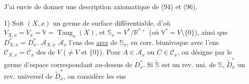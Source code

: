 J'ai envie de donner une description axiomatique de (94) et (96).

1) Soit  $(X,x)$ un germe de surface différentiable, d'où
$V_{X,x}=V_x=\mathbb V=\operatorname{Tang}_x(X)$,
et $\mathbb S_x=V^*/\mathbb R^{*+}$ (où $\mathbb V^*=V\setminus\{0\}$), ainsi que $D_{X,x}^*=D_x^*$.
$\mathcal A_{X,x}$  $\mathcal A_x$ l'ens des \uline{arcs} de $\mathbb S_x$, en corr. biunivoque avec l'ens $\mathcal C_{X,x}=\mathcal C_x$ des
 de $V$ ($\ne V$ et $\{0\}$).
Pour $A\in\mathcal A_x$ ou $C\in\mathcal C_x$, on désigne par
le germe d'espace correspondant au-dessus de $D_x^*$.
Si $\widetilde{\mathbb S}$ est un rev. uni. de $\mathbb S$, $\widetilde D_x^*$ un rev. universel de $\widetilde D_x^*$, on considère les ens


